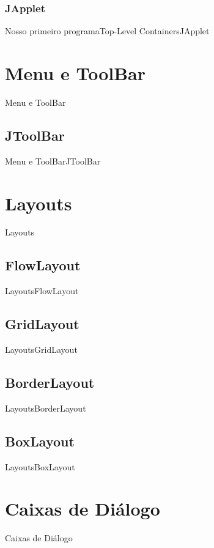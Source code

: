 \documentclass[10pt]{beamer}
\begin{document}
\subsubsection{JApplet}
\begin{frame}{Nosso primeiro programa}{Top-Level Containers}{JApplet}
\end{frame}{}
\section{Menu e ToolBar}
\begin{frame}{Menu e ToolBar}{}
\end{frame}{}
\subsection{JToolBar}
\begin{frame}{Menu e ToolBar}{JToolBar}
\end{frame}{}
\section{Layouts}
\begin{frame}{Layouts}{}
\end{frame}{}
\subsection{FlowLayout}
\begin{frame}{Layouts}{FlowLayout}
\end{frame}{}
\subsection{GridLayout}
\begin{frame}{Layouts}{GridLayout}
\end{frame}{}
\subsection{BorderLayout}
\begin{frame}{Layouts}{BorderLayout}
\end{frame}{}
\subsection{BoxLayout}
\begin{frame}{Layouts}{BoxLayout}
\end{frame}{}
\section{Caixas de Diálogo}
\begin{frame}{Caixas de Diálogo}{}
\end{frame}{}
\end{document}
